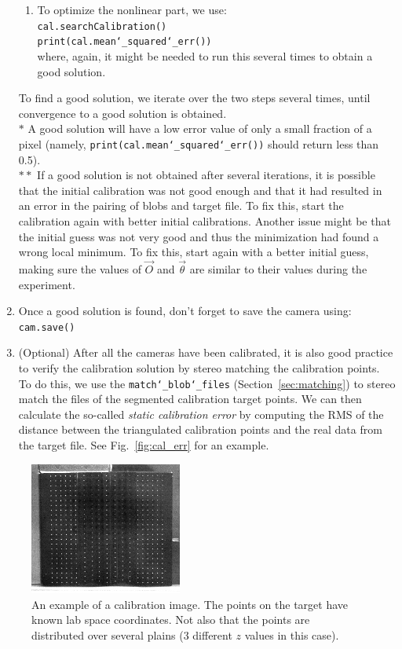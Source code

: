 \documentclass[10pt,a4paper]{article}
\begin{document}
\begin{enumerate}
\begin{enumerate}
		\item To optimize the nonlinear part, we use:\\[.5em]
		\texttt{cal.searchCalibration()}\\
		\texttt{print(cal.mean\char`_squared\char`_err())}\\[.5em]
		where, again, it might be needed to run this several times to obtain a good solution.
	\end{enumerate}
	To find a good solution, we iterate over the two steps several times, until convergence to a good solution is obtained.\\[1em] 
	$*$ A good solution will have a low error value of only a small fraction of a pixel (namely, \texttt{print(cal.mean\char`_squared\char`_err())} should return less than 0.5).\\[.5em]
	$**$ If a good solution is not obtained after several iterations, it is possible that the initial calibration was not good enough and that it had resulted in an error in the pairing of blobs and target file. To fix this, start the calibration again with better initial calibrations. Another issue might be that the initial guess was not very good and thus the minimization had found a wrong local minimum. To fix this, start again with a better initial guess, making sure the values of $\vec{O}$ and $\vec{\theta}$ are similar to their values during the experiment.
	
	\item Once a good solution is found, don't forget to save the camera using:\\[.5em]
	\texttt{cam.save()}
	
	\item (Optional) After all the cameras have been calibrated, it is also good practice to verify the calibration solution by stereo matching the calibration points. To do this, we use the \texttt{match\char`_blob\char`_files} (Section~\ref{sec:matching}) to stereo match the files of the segmented calibration target points. We can then calculate the so-called \textit{static calibration error} by computing the RMS of the distance between the triangulated calibration points and the real data from the target file. See Fig.~\ref{fig:cal_err} for an example. 
\end{enumerate}


\begin{figure}
	\centering
	\includegraphics[width=5cm]{cal_image.jpg}
	\caption{An example of a calibration image. The points on the target have known lab space coordinates. Not also that the points are distributed over several plains (3 different $z$ values in this case). \label{fig:cal_img}}
\end{figure}
\end{document}
